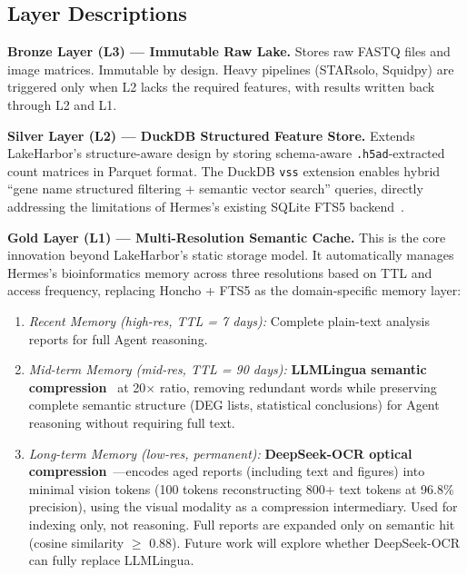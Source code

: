 \documentclass[sigconf]{acmart}
\begin{document}
\subsection{Layer Descriptions}

\textbf{Bronze Layer (L3) --- Immutable Raw Lake.}
Stores raw FASTQ files and image matrices. Immutable by design. Heavy pipelines (STARsolo, Squidpy) are triggered only when L2 lacks the required features, with results written back through L2 and L1.

\textbf{Silver Layer (L2) --- DuckDB Structured Feature Store.}
Extends LakeHarbor's structure-aware design by storing schema-aware \texttt{.h5ad}-extracted count matrices in Parquet format. The DuckDB \texttt{vss} extension enables hybrid ``gene name structured filtering + semantic vector search'' queries, directly addressing the limitations of Hermes's existing SQLite FTS5 backend~\cite{duckdb2019}.

\textbf{Gold Layer (L1) --- Multi-Resolution Semantic Cache.}
This is the core innovation beyond LakeHarbor's static storage model. It automatically manages Hermes's bioinformatics memory across three resolutions based on TTL and access frequency, replacing Honcho + FTS5 as the domain-specific memory layer:

\begin{enumerate}
  \item \textit{Recent Memory (high-res, TTL = 7 days):} Complete plain-text analysis reports for full Agent reasoning.

  \item \textit{Mid-term Memory (mid-res, TTL = 90 days):} \textbf{LLMLingua semantic compression}~\cite{llmlingua2023} at 20$\times$ ratio, removing redundant words while preserving complete semantic structure (DEG lists, statistical conclusions) for Agent reasoning without requiring full text.

  \item \textit{Long-term Memory (low-res, permanent):} \textbf{DeepSeek-OCR optical compression}~\cite{deepseekocr2025}---encodes aged reports (including text and figures) into minimal vision tokens (100 tokens reconstructing 800+ text tokens at 96.8\% precision), using the visual modality as a compression intermediary. Used for indexing only, not reasoning. Full reports are expanded only on semantic hit (cosine similarity $\geq$ 0.88). Future work will explore whether DeepSeek-OCR can fully replace LLMLingua.
\end{enumerate}
\end{document}
